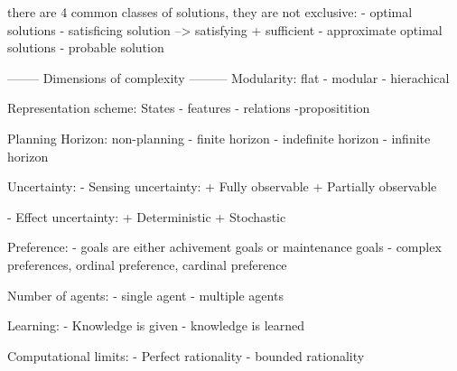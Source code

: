 there are 4 common classes of solutions, they are not exclusive:
- optimal solutions
- satisficing solution --> satisfying + sufficient
- approximate optimal solutions
- probable solution

 -------- Dimensions of complexity ---------
Modularity:
flat - modular - hierachical

Representation scheme:
States - features - relations -propositition

Planning Horizon:
non-planning - finite horizon - indefinite horizon - infinite horizon

Uncertainty:
- Sensing uncertainty:
+ Fully observable
+ Partially observable

- Effect uncertainty:
+ Deterministic
+ Stochastic

Preference:
- goals are either achivement goals or maintenance goals
- complex preferences, ordinal preference, cardinal preference

Number of agents:
- single agent
- multiple agents

Learning:
- Knowledge is given
- knowledge is learned

Computational limits:
- Perfect rationality
- bounded rationality
